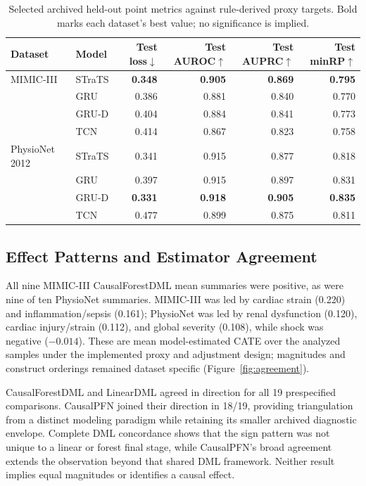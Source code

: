 \documentclass[letterpaper]{article}
\begin{document}
\begin{table}[!t]
  \centering
  \small
  \begin{tabular}{@{}llrrrr@{}}
    \toprule
    Dataset & Model & Test loss$\downarrow$ & Test AUROC$\uparrow$ & Test AUPRC$\uparrow$ & Test minRP$\uparrow$ \\
    \midrule
    MIMIC-III & STraTS & \textbf{0.348} & \textbf{0.905} & \textbf{0.869} & \textbf{0.795} \\
    & GRU & 0.386 & 0.881 & 0.840 & 0.770 \\
    & GRU-D & 0.404 & 0.884 & 0.841 & 0.773 \\
    & TCN & 0.414 & 0.867 & 0.823 & 0.758 \\
    \addlinespace
    PhysioNet 2012 & STraTS & 0.341 & 0.915 & 0.877 & 0.818 \\
    & GRU & 0.397 & 0.915 & 0.897 & 0.831 \\
    & GRU-D & \textbf{0.331} & \textbf{0.918} & \textbf{0.905} & \textbf{0.835} \\
    & TCN & 0.477 & 0.899 & 0.875 & 0.811 \\
    \bottomrule
  \end{tabular}
  \caption{Selected archived held-out point metrics against rule-derived proxy
  targets. Bold marks each dataset's best value; no significance is implied.}
  \label{tab:predictive-results}
\end{table}

\subsection{Effect Patterns and Estimator Agreement}

All nine MIMIC-III CausalForestDML mean summaries were positive, as were nine of
ten PhysioNet summaries. MIMIC-III was led by cardiac strain (0.220) and
inflammation/sepsis (0.161); PhysioNet was led by renal dysfunction (0.120),
cardiac injury/strain (0.112), and global severity (0.108), while shock was
negative ($-0.014$). These are mean model-estimated CATE over the analyzed
samples under the implemented proxy and adjustment design; magnitudes and
construct orderings remained dataset specific (Figure~\ref{fig:agreement}).

CausalForestDML and LinearDML agreed in direction for all 19 prespecified
comparisons. CausalPFN joined their direction in 18/19, providing triangulation
from a distinct modeling paradigm while retaining its smaller archived
diagnostic envelope. Complete DML concordance shows that the sign pattern was
not unique to a linear or forest final stage, while CausalPFN's broad agreement
extends the observation beyond that shared DML framework. Neither result implies
equal magnitudes or identifies a causal effect.
\end{document}
